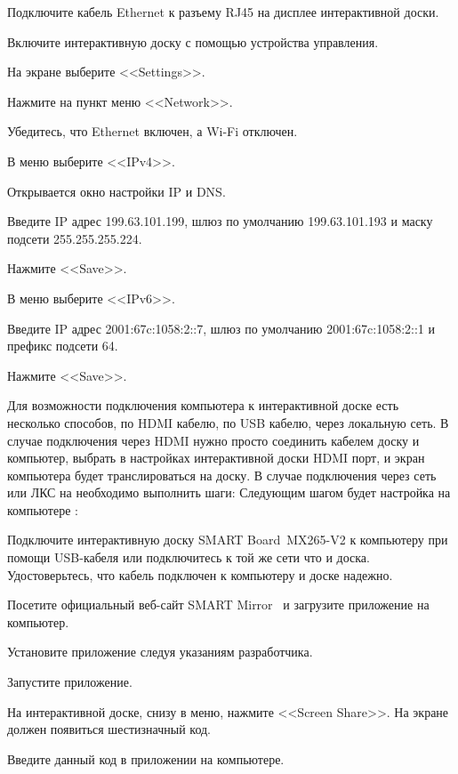 \begin{enumerate_num}
    \item Подключите кабель Ethernet к разъему RJ45 на дисплее интерактивной доски.
    \item Включите интерактивную доску с помощью устройства управления.
    \item На экране выберите <<Settings>>.
    \item Нажмите на пункт меню <<Network>>.
    \item Убедитесь, что Ethernet включен, а Wi-Fi отключен.
    \item В меню выберите <<IPv4>>.
    \item Открывается окно настройки IP и DNS.
    \item Введите IP адрес 199.63.101.199, шлюз по умолчанию 199.63.101.193 и маску подсети 255.255.255.224.
    \item Нажмите <<Save>>.
    \item В меню выберите <<IPv6>>.
    \item Введите IP адрес 2001:67c:1058:2::7, шлюз по умолчанию 2001:67c:1058:2::1 и префикс подсети 64.
    \item Нажмите <<Save>>.
\end{enumerate_num}

Для возможности подключения компьютера к интерактивной доске есть несколько способов, по HDMI кабелю, по USB кабелю, через локальную сеть. В случае подключения через HDMI нужно просто соединить кабелем доску и компьютер, выбрать в настройках интерактивной доски HDMI порт, и экран компьютера будет транслироваться на доску. В случае подключения через сеть или ЛКС на  необходимо выполнить шаги:
Следующим шагом будет настройка на компьютере :
\begin{enumerate_num}
    \item Подключите интерактивную доску SMART Board~MX265-V2 к компьютеру при помощи USB-кабеля или подключитесь к той же сети что и доска. Удостоверьтесь, что кабель подключен к компьютеру и доске надежно.
    \item Посетите официальный веб-сайт SMART Mirror~\cite{smart_mirror} и загрузите приложение на компьютер.
    \item Установите приложение следуя указаниям разработчика.
    \item Запустите приложение.
    \item На интерактивной доске, снизу в меню, нажмите <<Screen Share>>. На экране должен появиться шестизначный код.
    \item Введите данный код в приложении на компьютере.
\end{enumerate_num}

